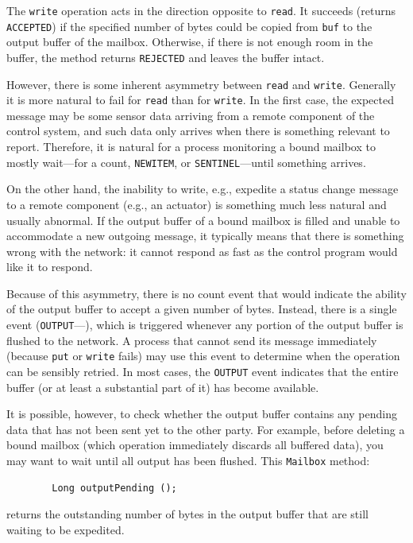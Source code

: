 \medskip

The {\tt write} operation acts in the direction opposite to {\tt read}.
It succeeds (returns {\tt ACCEPTED}) if the specified number of bytes could
be copied from {\tt buf} to the output buffer of the mailbox.
Otherwise, if there is not enough room in the buffer,
the method returns {\tt REJECTED} and leaves the buffer intact.

However, there is some inherent asymmetry between {\tt read} and {\tt write}.
Generally it is more natural to fail for {\tt read} than for {\tt write}.
In the first case,
the expected message may be some sensor data arriving from a remote
component of the control system, and such data only arrives when there is
something relevant to report.
Therefore, it is natural for a process monitoring a bound mailbox to
mostly wait---for a count, {\tt NEWITEM}, or {\tt SENTINEL}---until
something arrives.

On the other hand, the inability to write, e.g.,
expedite a status change message to
a remote component (e.g., an actuator) is something much less natural
and usually abnormal.
If the output buffer of a bound mailbox is filled and unable to accommodate
a new outgoing message, it typically means that there is something wrong
with the network: it cannot respond as fast as the control program
would like it to respond.

Because of this asymmetry, there is no count event that would indicate the
ability of the output buffer to accept a given number of bytes.
Instead, there is a single event ({\tt OUTPUT}---), which
is triggered whenever any portion of the output buffer is flushed to the
network.
A process that cannot send its message immediately
(because {\tt put} or {\tt write} fails)
may use this event to determine when the operation can be sensibly retried.
In most cases, the {\tt OUTPUT} event indicates that the entire buffer
(or at least a substantial part of it) has become available.

It is possible, however, to check whether the output buffer contains any
pending data that has not been sent yet to the other party.
For example, before deleting a bound mailbox (which operation immediately
discards all buffered data), you may want to wait until all output has been
flushed.
This {\tt Mailbox} method:

\begin{verbatim}
        Long outputPending ();
\end{verbatim}
returns the outstanding number of bytes in the output buffer that are still
waiting to be expedited.

